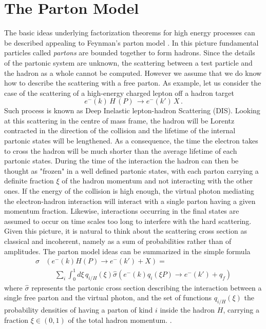 \section{The Parton Model}
The basic ideas underlying factorization theorems for high energy processes can 
be described appealing to Feynman's parton model \cite{PhysRevLett.23.1415,Feynman:1973xc, Bjorken:1969ja}.
In this picture fundamental particles called \textit{partons} are bounded together to form hadrons.
Since the details of the partonic system are unknown, the scattering between a test particle and the hadron 
as a whole cannot be computed. However we assume that we do know how to describe the scattering with a free parton.
%
As example, let us consider the case of the scattering of a high-energy charged lepton off a
hadron target 
$$e^{-}(k)\,H\,(P)\,\rightarrow e^{-}(k')\,X \,. $$ 
Such process is known as Deep Inelastic lepton-hadron Scattering (DIS).
Looking at this scattering in the centre of mass frame, the hadron will be Lorentz contracted 
in the direction of the collision and the lifetime of the internal partonic states will be lengthened.
As a consequence, the time the electron takes to cross the hadron will be much shorter than the average lifetime of
each partonic states. During the time of the interaction the hadron can then be thought as "frozen" in 
a well defined partonic states, with each parton carrying a definite fraction $\xi$ of the hadron momentum
and not interacting with the other ones. 
If the energy of the collision is high enough, the virtual photon mediating the electron-hadron 
interaction will interact with a single parton having a given momentum fraction. Likewise, interactions
occurring in the final states are assumed to occur on time scales too long to interfere with the hard scattering.
%
Given this picture, it is natural to think about the scattering cross section as classical and incoherent,
namely as a sum of probabilities rather than of amplitudes. The parton model ideas can be summarized in the simple formula
\begin{align}
    \label{eq:parton_model}
    \sigma&\left(e^{-}\left(k\right)H\left(P\right)\rightarrow e^{-}\left(k'\right)+X\right) = \nonumber\\
     &\,\,\,\,\,\,\,\,\sum_i\int_0^1 d\xi\, q_{i/H}\left(\xi\right)
     \hat{\sigma}\left(e^{-}\left(k\right)q_i\left(\xi P\right)\rightarrow e^{-}\left(k'\right)+q_f\right)
\end{align}
where $\hat{\sigma}$ represents the partonic cross section describing the interaction between 
a single free parton and the virtual photon, and the set of functions $q_{i/H}\left(\xi\right)$ the probability densities
of having a parton of kind $i$ inside the hadron $H$, carrying a fraction $\xi \in \left(0,1\right)$ of the total hadron momentum. . 

